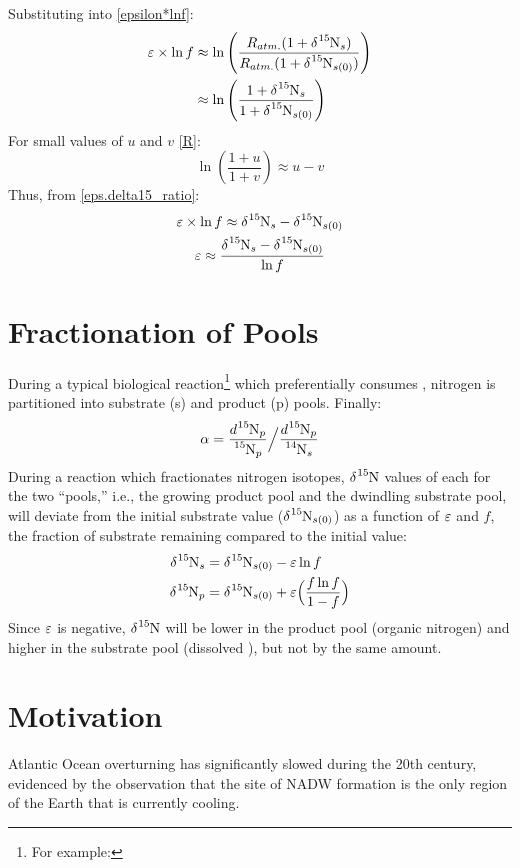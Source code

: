 Substituting into \eqref{epsilon*lnf}:
\begin{align}
    \eps \times \ln{f} &\approx \ln{\left(\frac{R_{atm.}(1+\delta\ce{^{15}N}_s)}{R_{atm.}(1+\delta\ce{^{15}N}_{s(0)})}\right)}\nonumber\\
    &\approx \ln{\left(\frac{1+\delta\ce{^{15}N}_s}{1+\delta\ce{^{15}N}_{s(0)}}\right)}\label{eps.delta15_ratio}
\end{align}
For small values of $u$ and $v$ \eqref{R}:
\[\ln{\left(\frac{1+u}{1+v}\right)}\approx u-v\]
Thus, from \eqref{eps.delta15_ratio}:
\begin{gather}
    \eps \times \ln{f} \approx \delta\ce{^{15}N}_s - \delta\ce{^{15}N}_{s(0)}\nonumber\\
    \eps \approx \frac{\delta\ce{^{15}N}_s - \delta\ce{^{15}N}_{s(0)}}{\ln{f}}
\end{gather}
\section{Fractionation of Pools}
During a typical biological reaction\footnote{For example: } which preferentially consumes , nitrogen is partitioned into substrate (s) and product (p) pools. 
Finally:
\begin{equation}
    \alpha = \dfrac{d\ce{^{15}N_p}}{\ce{^{15}N_p}}\Big/\dfrac{d\ce{^{15}N_p}}{\ce{^{14}N_s}}
\end{equation}
During a reaction which fractionates nitrogen isotopes,  $\delta\ce{^{15}N}$ values of each for the two ``pools,'' i.e., the growing product pool and the dwindling substrate pool, will deviate from the initial substrate value ($\delta\ce{^{15}N_{s(0)}}$) as a function of $\varepsilon$ and $f$, the fraction of substrate remaining compared to the initial value:
\begin{align}
    \delta\ce{^{15}N_s}&=\delta\ce{^{15}N_{s(0)}}-\eps\ln{f}\label{d15ns}\\
    \delta\ce{^{15}N_p}&=\delta\ce{^{15}N_{s(0)}}+\eps\Big(\frac{f\ln{f}}{1-f}\Big)\label{d15np}
\end{align}
Since $\varepsilon$ is negative, $\delta\ce{^{15}N}$ will be lower in the product pool (organic nitrogen) and higher in the substrate pool (dissolved ), but not by the same amount.
\section{Motivation}
Atlantic Ocean overturning has significantly slowed during the 20th century, evidenced by the observation that the site of NADW formation is the only region of the Earth that is currently cooling.